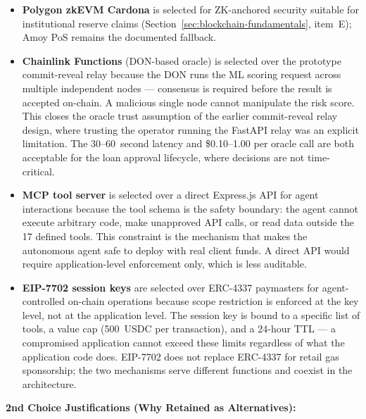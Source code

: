 \documentclass[12pt,a4paper]{report}
\begin{document}
\begin{itemize}[noitemsep]
\item \textbf{Polygon zkEVM Cardona} is selected for ZK-anchored security suitable for institutional reserve claims (Section~\ref{sec:blockchain-fundamentals}, item~E); Amoy PoS remains the documented fallback.

\item \textbf{Chainlink Functions} (DON-based oracle) is selected over the prototype commit-reveal relay because the DON runs the ML scoring request across multiple independent nodes --- consensus is required before the result is accepted on-chain. A malicious single node cannot manipulate the risk score. This closes the oracle trust assumption of the earlier commit-reveal relay design, where trusting the operator running the FastAPI relay was an explicit limitation. The 30--60~second latency and \$0.10--1.00 per oracle call are both acceptable for the loan approval lifecycle, where decisions are not time-critical.

\item \textbf{MCP tool server} is selected over a direct Express.js API for agent interactions because the tool schema is the safety boundary: the agent cannot execute arbitrary code, make unapproved API calls, or read data outside the 17 defined tools. This constraint is the mechanism that makes the autonomous agent safe to deploy with real client funds. A direct API would require application-level enforcement only, which is less auditable.

\item \textbf{EIP-7702 session keys} are selected over ERC-4337 paymasters for agent-controlled on-chain operations because scope restriction is enforced at the key level, not at the application level. The session key is bound to a specific list of tools, a value cap (500~USDC per transaction), and a 24-hour TTL --- a compromised application cannot exceed these limits regardless of what the application code does. EIP-7702 does not replace ERC-4337 for retail gas sponsorship; the two mechanisms serve different functions and coexist in the architecture.
\end{itemize}

\textbf{2nd Choice Justifications (Why Retained as Alternatives):}
\end{document}
